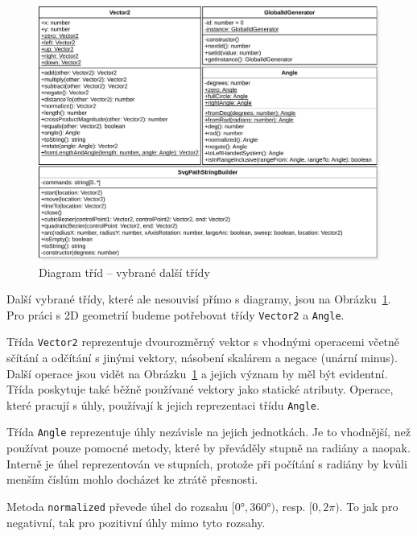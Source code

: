 \begin{figure}[!htb]
  \centering
  \includegraphics[width=\maxwidth{\textwidth}]{../img/diagrams/utils-class-diagram.pdf}
  \caption{Diagram tříd -- vybrané další třídy}
  \label{fig:utils-class-diagram}
\end{figure}

Další vybrané třídy, které ale nesouvisí přímo s diagramy, jsou na Obrázku~\ref{fig:utils-class-diagram}.
Pro práci s 2D geometrií budeme potřebovat třídy \texttt{Vector2} a \texttt{Angle}.

Třída \texttt{Vector2} reprezentuje dvourozměrný vektor s vhodnými operacemi včetně sčítání a odčítání s jinými vektory, násobení skalárem a negace (unární minus).
Další operace jsou vidět na Obrázku~\ref{fig:utils-class-diagram} a jejich význam by měl být evidentní.
Třída poskytuje také běžně používané vektory jako statické atributy.
Operace, které pracují s úhly, používají k jejich reprezentaci třídu \texttt{Angle}.

Třída \texttt{Angle} reprezentuje úhly nezávisle na jejich jednotkách.
Je to vhodnější, než používat pouze pomocné metody, které by převáděly stupně na radiány a naopak.
Interně je úhel reprezentován ve stupních, protože při počítání s radiány by kvůli menším číslům mohlo docházet ke ztrátě přesnosti.

Metoda \texttt{normalized} převede úhel do rozsahu $[0°, 360°)$, resp. $[0, 2\pi)$.
To jak pro negativní, tak pro pozitivní úhly mimo tyto rozsahy.

